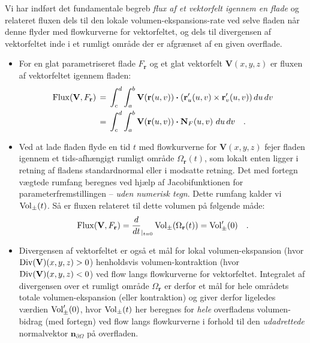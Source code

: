 \begin{summary}
Vi har indført det fundamentale begreb \emph{flux af et vektorfelt igennem en flade} og relateret fluxen dels til den lokale volumen-ekspansions-rate ved selve fladen når denne flyder med flowkurverne for vektorfeltet, og dels til divergensen af vektorfeltet inde i et rumligt område der er afgrænset af en given overflade.
\begin{itemize}
\item For en glat parametriseret flade $F_{\mathbf{r}}$ og et glat vektorfelt $\mathbf{V}(x,y,z)$ er fluxen af vektorfeltet igennem fladen:
\begin{equation}
\begin{aligned}
\operatorname{Flux}({\bf V}, F_{\bf r})\,&= \, \int_{c}^{d}\int_{a}^{b}{\bf V}({\bf r}(u,v)) \bm{\cdot} ({\bf
r}'_{u}(u,v)\times{\bf r}'_{v}(u,v))\,du \, dv  \\
&= \, \int_{c}^{d}\int_{a}^{b}{\bf V}({\bf r}(u,v)) \bm{\cdot} \mathbf{N}_{F}(u,v)\,\,du \, dv  \quad .
\end{aligned}
\end{equation}
\item Ved at lade fladen flyde en tid $t$ med flowkurverne for $\mathbf{V}(x,y,z)$ fejer fladen igennem et tids-afhængigt rumligt område $\Omega_{\mathbf{r}}(t)$, som lokalt enten ligger i retning af fladens standardnormal eller i modsatte retning. Det med fortegn vægtede rumfang beregnes ved hjælp af Jacobifunktionen for parameterfremstillingen -- \emph{uden numerisk tegn}. Dette rumfang kalder vi $\operatorname{Vol}_{\pm}(t)$. Så er fluxen relateret til dette volumen på følgende måde:
\begin{equation}
\operatorname{Flux}({\bf V}, F_{\bf r}) = \frac{d}{dt}_{|_{t=0}}\operatorname{Vol}_{\pm}(\Omega_{\mathbf{r}}(t)) = \operatorname{Vol}'_{\pm}(0) \quad.
\end{equation}
\item Divergensen af vektorfeltet er også et mål for lokal volumen-ekspansion (hvor $\operatorname{Div}(\mathbf{V})(x,y,z) > 0$) henholdsvis volumen-kontraktion (hvor $\operatorname{Div}(\mathbf{V})(x,y,z) < 0$) ved flow langs flowkurverne for vektorfeltet. Integralet af divergensen over et rumligt område $\Omega_{\mathbf{r}}$ er derfor et mål for hele områdets totale volumen-ekspansion (eller kontraktion) og giver derfor ligeledes værdien $\operatorname{Vol}'_{\pm}(0)$, hvor $\operatorname{Vol}_{\pm}(t)$ her beregnes for \emph{hele} overfladens volumen-bidrag (med fortegn) ved flow langs flow\-kur\-ver\-ne i forhold til den \emph{udadrettede} normalvektor $\mathbf{n}_{\partial \Omega}$ på overfladen. \\


\end{itemize}
\end{summary}
